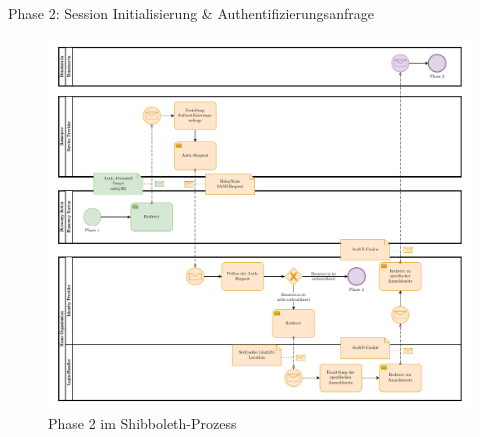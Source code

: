 \begin{frame}{Phase 2: Session Initialisierung \& Authentifizierungsanfrage}
    \begin{figure}
        \includegraphics[height=0.7\paperheight]{../assets/bis_bpmn_phase_2.drawio.pdf}
        \caption{Phase 2 im Shibboleth-Prozess~\cite[vgl.][]{switchExpertDemoSWITCHaai2024a}}
    \end{figure}
\end{frame}


